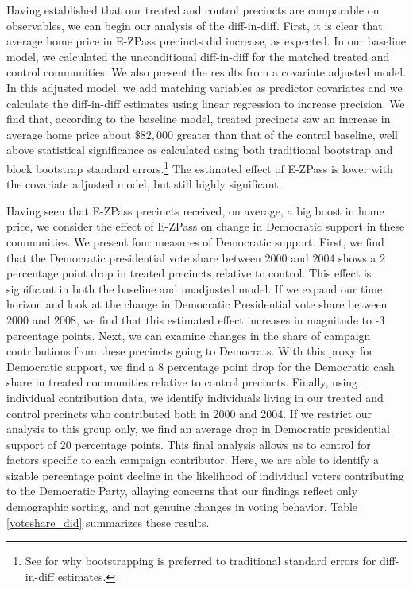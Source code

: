 
Having established that our treated and control precincts are comparable on observables, we can begin our analysis of the diff-in-diff. First, it is clear that average home price in E-ZPass precincts did increase, as expected. In our baseline model, we calculated the unconditional diff-in-diff for the matched treated and control communities. We also present the results from a covariate adjusted model. In this adjusted model, we add matching variables as predictor covariates and we calculate the diff-in-diff estimates using linear regression to increase precision. We find that, according to the baseline model, treated precincts saw an increase in average home price about $\$82,000$ greater than that of the control baseline, well above statistical significance as calculated using both traditional bootstrap and block bootstrap standard errors.\footnote{See \textcite{Bertrand2004} for why bootstrapping is preferred to traditional standard errors for diff-in-diff estimates.}  The estimated effect of E-ZPass is lower with the covariate adjusted model, but still highly significant. 

Having seen that E-ZPass precincts received, on average, a big boost in home price, we consider the effect of E-ZPass on change in Democratic support in these communities. We present four measures of Democratic support. First, we find that the Democratic presidential vote share between $2000$ and $2004$ shows a $2$ percentage point drop in treated precincts relative to control. This effect is significant in both the baseline and unadjusted model. If we expand our time horizon and look at the change in Democratic Presidential vote share between $2000$ and $2008$, we find that this estimated effect increases in magnitude to -$3$ percentage points. Next, we can examine changes in the share of campaign contributions from these precincts going to Democrats. With this proxy for Democratic support, we find a $8$ percentage point drop for the Democratic cash share in treated communities relative to control precincts. Finally, using individual contribution data, we identify individuals living in our treated and control precincts who contributed both in 2000 and 2004. If we restrict our analysis to this group only, we find an average drop in Democratic presidential support of $20$ percentage points. This final analysis allows us to control for factors specific to each campaign contributor. Here, we are able to identify a sizable percentage point decline in the likelihood of individual voters contributing to the Democratic Party, allaying concerns that our findings reflect only demographic sorting, and not genuine changes in voting behavior. Table \ref{voteshare_did} summarizes these results. 

